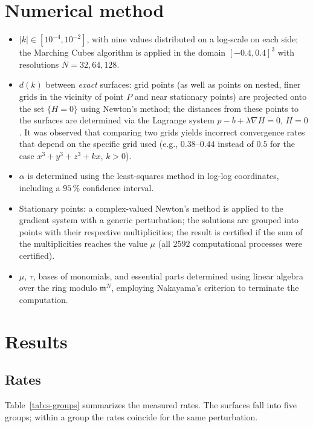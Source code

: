 \documentclass[11pt, a4paper]{article}
\theoremstyle{plain}
\theoremstyle{definition}
\theoremstyle{remark}
\theoremstyle{definition}
\begin{document}
\section{Numerical method}

\begin{itemize}
\item $|k|\in[10^{-4},10^{-2}]$, with nine values distributed on a log-scale on each side; the Marching Cubes algorithm
is applied in the domain $[-0.4,0.4]^3$ with resolutions $N=32, 64, 128$.
\item $d(k)$ between \emph{exact} surfaces: grid points (as well as points
on nested, finer grids in the vicinity of point $P$ and near stationary points) are projected
onto the set $\{H=0\}$ using Newton's method; the distances from these points to the surfaces are determined
via the Lagrange system $p-b+\lambda\nabla H=0$, $H=0$. It was observed that comparing two grids
yields incorrect convergence rates that depend on the specific grid used (e.g., $0.38$--$0.44$ instead of
$0.5$ for the case $x^3+y^3+z^3+kx$, $k>0$).
\item $\alpha$ is determined using the least-squares method in log-log coordinates,
including a $95\,\%$ confidence interval.
\item Stationary points: a complex-valued Newton's method is applied to the gradient system with a generic perturbation; the solutions are grouped into points with their respective multiplicities;
the result is certified if the sum of the multiplicities reaches the value $\mu$ (all $2592$ computational processes were certified).
\item $\mu$, $\tau$, bases of monomials, and essential parts determined using linear algebra
over the ring modulo $\mathfrak m^N$, employing Nakayama's criterion to terminate the computation.
\end{itemize}

\section{Results}

\subsection{Rates}

Table~\ref{tab:s-groups} summarizes the measured rates. The surfaces fall into five
groups; within a group the rates coincide for the same perturbation.
\end{document}
